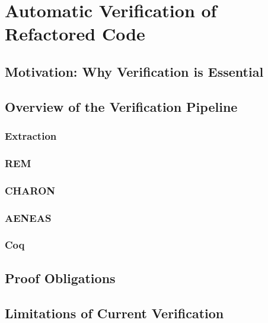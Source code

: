 \chapter{Automatic Verification of Refactored Code}
\label{chap:verification}



\section{Motivation: Why Verification is Essential}
\label{sec:motivation_verification}

\section{Overview of the Verification Pipeline}
\label{verification pipeline}

\subsection{Extraction}

\subsection{REM}

\subsection{CHARON}

\subsection{AENEAS}

\subsection{Coq}

\section{Proof Obligations}
\label{sec:proof_obligations}

\section{Limitations of Current Verification}
\label{sec:limitations_verification}



